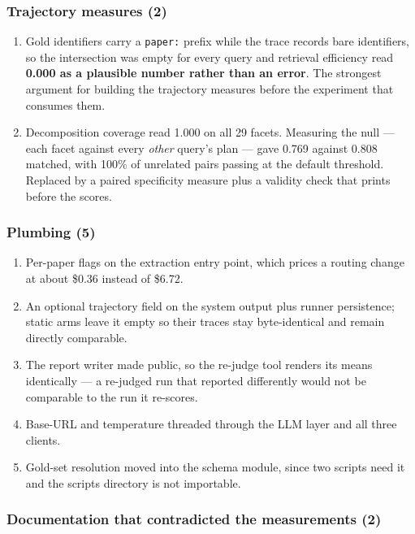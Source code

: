 \subsubsection*{Trajectory measures (2)}

\begin{enumerate}[label=F\arabic*.]
  \item Gold identifiers carry a \texttt{paper:} prefix while the trace records
        bare identifiers, so the intersection was empty for every query and
        retrieval efficiency read \textbf{0.000 as a plausible number rather
        than an error}. The strongest argument for building the trajectory
        measures before the experiment that consumes them.
  \item Decomposition coverage read 1.000 on all 29 facets. Measuring the null
        --- each facet against every \emph{other} query's plan --- gave 0.769
        against 0.808 matched, with 100\% of unrelated pairs passing at the
        default threshold. Replaced by a paired specificity measure plus a
        validity check that prints before the scores.
\end{enumerate}

\subsubsection*{Plumbing (5)}

\begin{enumerate}[label=G\arabic*.]
  \item Per-paper flags on the extraction entry point, which prices a routing
        change at about \$0.36 instead of \$6.72.
  \item An optional trajectory field on the system output plus runner
        persistence; static arms leave it empty so their traces stay
        byte-identical and remain directly comparable.
  \item The report writer made public, so the re-judge tool renders its means
        identically --- a re-judged run that reported differently would not be
        comparable to the run it re-scores.
  \item Base-URL and temperature threaded through the LLM layer and all three
        clients.
  \item Gold-set resolution moved into the schema module, since two scripts need
        it and the scripts directory is not importable.
\end{enumerate}

\subsubsection*{Documentation that contradicted the measurements (2)}

